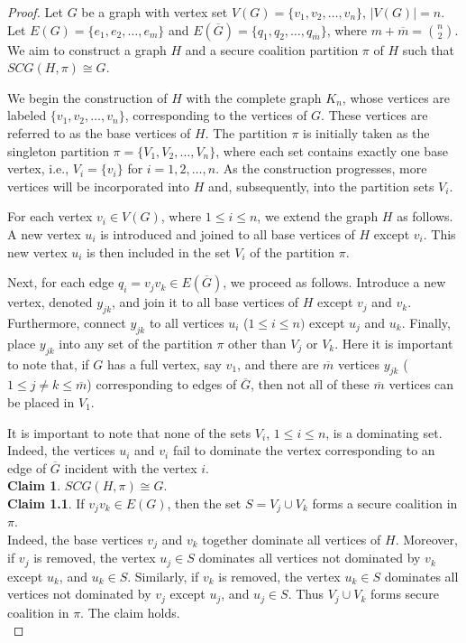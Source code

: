 \documentclass[12pt]{article}
\begin{document}
\begin{proof}
 Let $G$ be a graph with vertex set $
V(G) = \{v_1, v_2, \dots, v_n\}$,
$|V(G)|=n$. Let 
$E(G) = \{e_1, e_2, \dots, e_m\}$ and  
$E(\overline{G}) = \{q_1, q_2, \dots, q_{\overline{m}}\}$,
where $m + \overline{m} = \binom{n}{2}$.
We aim to construct a graph $H$ and a secure coalition partition $\pi$ of $H$ such that 
$SCG(H,\pi) \cong G$.\par
We begin the construction of $H$ with the complete graph $K_n$, whose vertices are labeled 
$\{v_1, v_2, \dots, v_n\}$, corresponding to the vertices of $G$. These vertices are referred to as the base vertices of $H$. 
The partition $\pi$ is initially taken as the singleton partition 
$\pi = \{V_1, V_2, \dots, V_n\}$, where each set contains exactly one base vertex, i.e., $V_i = \{v_i\}$ for $i = 1,2,\dots,n$. As the construction progresses, more vertices will be incorporated into $H$ and, subsequently, into the partition sets $V_i$.\par
For each vertex $v_i \in V(G)$, where $1 \le i \le n$, we extend the graph $H$ as follows.  
A new vertex $u_i$ is introduced and joined to all base vertices of $H$ except $v_i$.  
This new vertex $u_i$ is then included in the set $V_i$ of the partition $\pi$.\par
Next, for each edge $q_i = v_jv_k \in E(\overline{G})$, we proceed as follows.  
Introduce a new vertex, denoted $y_{jk}$, and join it to all base vertices of $H$ except $v_j$ and $v_k$.  
Furthermore, connect $y_{jk}$ to all vertices $u_i$ ($1\le i \le n)$ except $u_j$ and $u_k$.  
Finally, place $y_{jk}$ into any set of the partition $\pi$ other than $V_j$ or $V_k$.  Here it is important to note that, if $G$ has a full vertex, say $v_1$, and there are $\overline{m}$ vertices $y_{jk}$ ($1\le j \neq k\le \overline{m}$) corresponding to edges of $\overline{G}$, then not all of these $\overline{m}$ vertices can be placed in $V_1$.\par
It is important to note that none of the sets $V_i$, $1\le i\le n$, is a dominating set. Indeed, the vertices $u_i$ and $v_i$ fail to dominate the vertex corresponding to an edge of $\overline{G}$ incident with the vertex $i$.\\[2mm]
\textbf{Claim 1}. $SCG(H,\pi)\cong G$.\\[2mm]
\textbf{Claim 1.1}. If $v_jv_k \in E(G)$, then the set $S = V_j \cup V_k$ forms a secure coalition in $\pi$.\\[2mm]
Indeed, the base vertices $v_j$ and $v_k$ together dominate all vertices of $H$. Moreover, if $v_j$ is removed, the vertex $u_j \in S$ dominates all vertices not dominated by $v_k$ except $u_k$, and $u_k \in S$. Similarly, if $v_k$ is removed, the vertex $u_k \in S$ dominates all vertices not dominated by $v_j$ except $u_j$, and $u_j \in S$. Thus $V_j\cup V_k$ forms secure coalition in $\pi$. The  claim holds.\\[2mm]

\end{proof}
\end{document}
